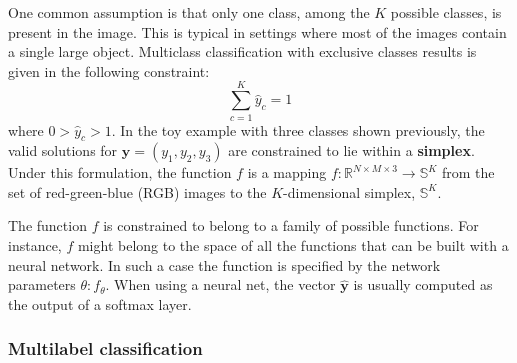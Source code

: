 One common assumption is that only one class, among the $K$ possible classes, is present in the image. This is typical in settings where most of the images contain a single large object.   
Multiclass classification with exclusive classes results is given in the following constraint: 
\begin{equation}
\sum_{c=1}^K \hat{y}_c=1
\end{equation}
where $0>\hat{y}_c>1$.
In the toy example with three classes shown previously, the valid solutions for $\mathbf{y}=(y_1, y_2, y_3)$ are constrained to lie within a \textbf{simplex}.
Under this formulation, the function $f$ is a mapping $f:\mathbb{R}^{N \times M \times 3} \rightarrow \mathbb{S}^K$ from the set of red-green-blue (RGB) images to the $K$-dimensional simplex, $\mathbb{S}^K$. 


The function $f$ is constrained to belong to a family of possible functions. For instance, $f$ might belong to the space of all the functions that can be built with a neural network. In such a case the function is specified by the network parameters $\theta: f_\theta$. When using a neural net, the vector $\hat{\mathbf{y}}$ is usually computed as the output of a softmax layer. 

\subsubsection{Multilabel classification}

